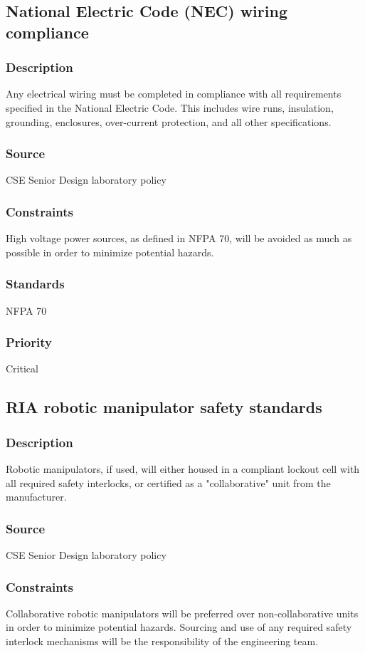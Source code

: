 \subsection{National Electric Code (NEC) wiring compliance}
\subsubsection{Description}
Any electrical wiring must be completed in compliance with all requirements specified in the National Electric Code. This includes wire runs, insulation, grounding, enclosures, over-current protection, and all other specifications.
\subsubsection{Source}
CSE Senior Design laboratory policy
\subsubsection{Constraints}
High voltage power sources, as defined in NFPA 70, will be avoided as much as possible in order to minimize potential hazards.
\subsubsection{Standards}
NFPA 70
\subsubsection{Priority}
Critical

\subsection{RIA robotic manipulator safety standards}
\subsubsection{Description}
Robotic manipulators, if used, will either housed in a compliant lockout cell with all required safety interlocks, or certified as a "collaborative" unit from the manufacturer.
\subsubsection{Source}
CSE Senior Design laboratory policy
\subsubsection{Constraints}
Collaborative robotic manipulators will be preferred over non-collaborative units in order to minimize potential hazards. Sourcing and use of any required safety interlock mechanisms will be the responsibility of the engineering team.
